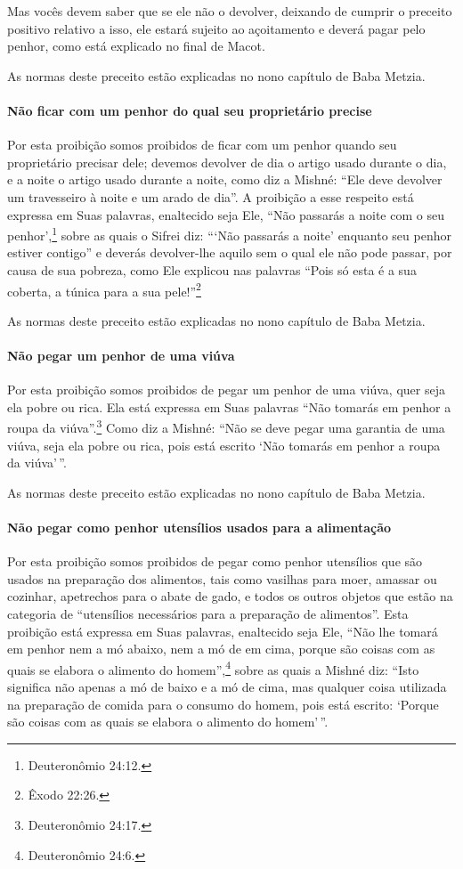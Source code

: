Mas vocês devem saber que se ele não o devolver, deixando de cumprir o
preceito positivo relativo a isso, ele estará sujeito ao açoitamento e
deverá pagar pelo penhor, como está explicado no final de Macot.

As normas deste preceito estão explicadas no nono capítulo de Baba Metzia.

\paragraph{Não ficar com um penhor do qual seu proprietário precise}

Por esta proibição somos proibidos de ficar com um penhor quando seu
proprietário precisar dele; devemos devolver de dia o artigo usado
durante o dia, e a noite o artigo usado durante a noite, como diz a
Mishné: ``Ele deve devolver um travesseiro à noite e um arado de dia''.
A proibição a esse respeito está expressa em Suas palavras, enaltecido
seja Ele, ``Não passarás a noite com o seu penhor',\footnote{Deuteronômio
24:12.} sobre as quais o Sifrei diz: ```Não passarás a noite' enquanto
seu penhor estiver contigo'' e deverás devolver-lhe aquilo sem o qual
ele não pode passar, por causa de sua pobreza, como Ele explicou nas
palavras ``Pois só esta é a sua coberta, a túnica para a sua pele!''\footnote{Êxodo 22:26.}

As normas deste preceito estão explicadas no nono capítulo de Baba Metzia.

\paragraph{Não pegar um penhor de uma viúva}

Por esta proibição somos proibidos de pegar um penhor de uma viúva,
quer seja ela pobre ou rica. Ela está expressa em Suas palavras ``Não
tomarás em penhor a roupa da viúva''.\footnote{Deuteronômio 24:17.} Como diz a
Mishné: ``Não se deve pegar uma garantia de uma viúva, seja ela pobre ou
rica, pois está escrito `Não tomarás em penhor a roupa da viúva'\,''.

As normas deste preceito estão explicadas no nono capítulo de Baba Metzia.

\paragraph{Não pegar como penhor utensílios usados para a alimentação}

Por esta proibição somos proibidos de pegar como penhor utensílios que
são usados na preparação dos alimentos, tais como vasilhas para moer,
amassar ou cozinhar, apetrechos para o abate de gado, e todos os outros
objetos que estão na categoria de ``utensílios necessários para a
preparação de alimentos''. Esta proibição está expressa em Suas
palavras, enaltecido seja Ele, ``Não lhe tomará em penhor nem a mó
abaixo, nem a mó de em cima, porque são coisas com as quais se elabora o
alimento do homem'',\footnote{Deuteronômio 24:6.} sobre as quais a Mishné diz:
``Isto significa não apenas a mó de baixo e a mó de cima, mas qualquer
coisa utilizada na preparação de comida para o consumo do homem, pois
está escrito: `Porque são coisas com as quais se elabora o alimento do
homem'\,''.

